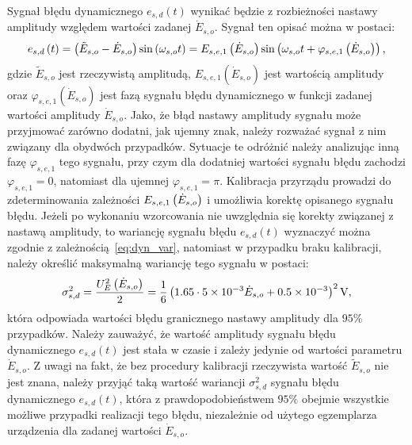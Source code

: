Sygnał błędu dynamicznego $e_{s,d}(t)$ wynikać będzie z rozbieżności nastawy amplitudy względem wartości zadanej $\dot{E}_{s,o}$. Sygnał ten opisać można w postaci:
\begin{equation}
e_{s,d} \left(t\right) = \left(\tilde{E}_{s,o} - \dot{E}_{s,o}\right) \sin \left(\omega_{s,o} t\right) = E_{s,e,1} \left(\dot{E}_{s,o}\right) \sin \left(\omega_{s,o} t + \varphi_{s,e,1} \left(\dot{E}_{s,o}\right)\right) \label{eq:pom_gen_err_dyn_mono},
\end{equation}
gdzie $\tilde{E}_{s,o}$ jest rzeczywistą amplitudą, $E_{s,e,1}(\dot{E}_{s,o})$ jest wartością amplitudy oraz $\varphi_{s,e,1}(\dot{E}_{s,o})$ jest fazą sygnału błędu dynamicznego w funkcji zadanej wartości amplitudy $\dot{E}_{s,o}$. Jako, że błąd nastawy amplitudy sygnału może przyjmować zarówno dodatni, jak ujemny znak, należy rozważać sygnał z nim związany dla obydwóch przypadków. Sytuacje te odróżnić należy analizując inną fazę $\varphi_{s,e,1}$ tego sygnału, przy czym dla dodatniej wartości sygnału błędu zachodzi $\varphi_{s,e,1} = 0$, natomiast dla ujemnej $\varphi_{s,e,1} = \pi$. Kalibracja przyrządu prowadzi do zdeterminowania zależności $E_{s,e,1} \left(\dot{E}_{s,o}\right)$ i umożliwia korektę opisanego sygnału błędu. Jeżeli po wykonaniu wzorcowania nie uwzględnia się korekty związanej z nastawą amplitudy, to wariancję sygnału błędu $e_{s,d}(t)$ wyznaczyć można zgodnie z zależnością~\eqref{eq:dyn_var}, natomiast w przypadku braku kalibracji, należy określić maksymalną wariancję tego sygnału w postaci:
\begin{equation}
\sigma_{s,d}^{2} = \frac{U_{E}^{2} \emb{\dot{E}_{s,o}}}{2} = \frac{1}{6} \emb{1.65 \cdot \num{5e-3} \dot{E}_{s,o} + \num{0.5e-3}}^{2} \unit{V} \label{eq:pom_gen_var_dyn},
\end{equation}
która odpowiada wartości błędu granicznego nastawy amplitudy dla $95\%$ przypadków. Należy zauważyć, że wartość amplitudy sygnału błędu dynamicznego $e_{s,d}(t)$ jest stała w czasie i zależy jedynie od wartości parametru $\dot{E}_{s,o}$. Z uwagi na fakt, że bez procedury kalibracji rzeczywista wartość $\tilde{E}_{s,o}$ nie jest znana, należy przyjąć taką wartość wariancji $\sigma_{s,d}^{2}$ sygnału błędu dynamicznego $e_{s,d}(t)$, która z prawdopodobieństwem $95\%$ obejmie wszystkie możliwe przypadki realizacji tego błędu, niezależnie od użytego egzemplarza urządzenia dla zadanej wartości $\dot{E}_{s,o}$.

